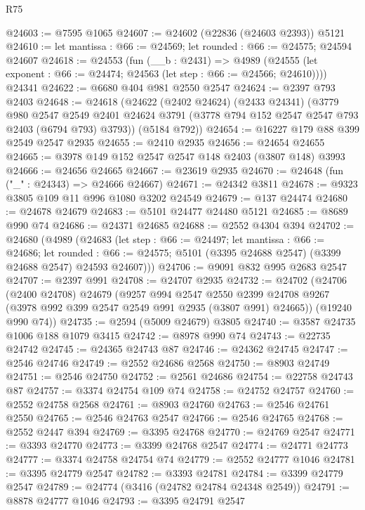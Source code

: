 \begin{lexlean}{R75}
\begin{coremodule}
@24603 := @7595 @1065
@24607 := @24602 (@22836 (@24603 @2393)) @5121
@24610 := let mantissa : @66 := @24569; let rounded : @66 := @24575; @24594 @24607
@24618 := @24553
    (fun (__b : @2431) =>
    @4989 (@24555 (let exponent : @66 := @24474; @24563 (let step : @66 := @24566; @24610))))
    @24341
@24622 := @6680 @404 @981 @2550 @2547
@24624 := @2397 @793 @2403
@24648 := @24618
    (@24622
      (@2402 @24624)
      (@2433 @24341)
      (@3779
        @980
        @2547
        @2549
        @2401
        @24624
        @3791
        (@3778 @794 @152 @2547 @2547 @793 @2403 (@6794 @793) @3793))
      (@5184 @792))
@24654 := @16227 @179 @88 @399 @2549 @2547 @2935
@24655 := @2410 @2935
@24656 := @24654 @24655
@24665 := @3978 @149 @152 @2547 @2547 @148 @2403 (@3807 @148) @3993
@24666 := @24656 @24665
@24667 := @23619 @2935
@24670 := @24648 (fun ("_" : @24343) => @24666 @24667)
@24671 := @24342 @3811
@24678 := @9323 @3805 @109 @11 @996 @1080 @3202 @24549
@24679 := @137 @24474
@24680 := @24678 @24679
@24683 := @5101 @24477 @24480 @5121
@24685 := @8689 @990 @74
@24686 := @24371 @24685
@24688 := @2552 @4304 @394
@24702 := @24680
    (@4989
      (@24683
        (let step : @66 := @24497;
        let mantissa : @66 := @24686;
        let rounded : @66 := @24575;
        @5101 (@3395 @24688 @2547) (@3399 @24688 @2547) @24593 @24607)))
@24706 := @9091 @832 @995 @2683 @2547
@24707 := @2397 @991
@24708 := @24707 @2935
@24732 := @24702
    (@24706
      (@2400 @24708)
      @24679
      (@9257
        @994
        @2547
        @2550
        @2399
        @24708
        @9267
        (@3978 @992 @399 @2547 @2549 @991 @2935 (@3807 @991) @24665))
      (@19240 @990 @74))
@24735 := @2594 (@5009 @24679) @3805
@24740 := @3587 @24735 @1006 @188 @1079 @3415
@24742 := @8978 @990 @74
@24743 := @22735 @24742
@24745 := @24365 @24743 @87
@24746 := @24362 @24745
@24747 := @2546 @24746
@24749 := @2552 @24686 @2568
@24750 := @8903 @24749
@24751 := @2546 @24750
@24752 := @2561 @24686
@24754 := @22758 @24743 @87
@24757 := @3374 @24754 @109 @74
@24758 := @24752 @24757
@24760 := @2552 @24758 @2568
@24761 := @8903 @24760
@24763 := @2546 @24761 @2550
@24765 := @2546 @24763 @2547
@24766 := @2546 @24765
@24768 := @2552 @2447 @394
@24769 := @3395 @24768
@24770 := @24769 @2547
@24771 := @3393 @24770
@24773 := @3399 @24768 @2547
@24774 := @24771 @24773
@24777 := @3374 @24758 @24754 @74
@24779 := @2552 @24777 @1046
@24781 := @3395 @24779 @2547
@24782 := @3393 @24781
@24784 := @3399 @24779 @2547
@24789 := @24774 (@3416 (@24782 @24784 @24348 @2549))
@24791 := @8878 @24777 @1046
@24793 := @3395 @24791 @2547

\end{coremodule}
\end{lexlean}
